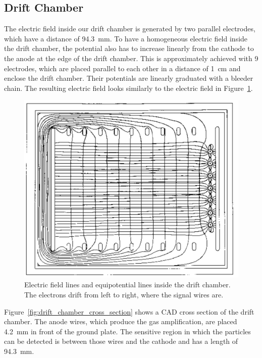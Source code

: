\documentclass[12pt]{article}
\begin{document}
\subsection{Drift Chamber}
\label{measurementsetupdriftchamber}

The electric field inside our drift chamber is generated by two parallel electrodes, which have a distance of \SI{94.3}{\milli\meter}. To have a homogeneous electric field inside the drift chamber, the potential also has to increase linearly from the cathode to the anode at the edge of the drift chamber. This is approximately achieved with 9 electrodes, which are placed parallel to each other in a distance of \SI{1}{\centi\meter} and enclose the drift chamber. Their potentials are linearly graduated with a bleeder chain. The resulting electric field looks similarly to the electric field in Figure~\ref{fig:potential}.

\begin{figure}[h]
\includegraphics[width=13cm]{pics/Potential}
\centering
\caption{Electric field lines and equipotential lines inside the drift chamber. The electrons drift from left to right, where the signal wires are.}
\label{fig:potential}
\end{figure}
 
Figure~\ref{fig:drift_chamber_cross_section} shows a CAD cross section of the drift chamber. The anode wires, which produce the gas amplification, are placed \SI{4.2}{\milli\meter} in front of the ground plate. The sensitive region in which the particles can be detected is between those wires and the cathode and has a length of \SI{94.3}{\milli\meter}.
\end{document}
